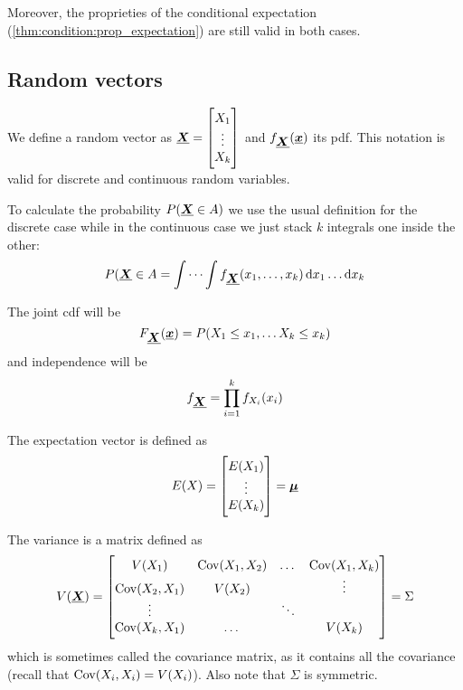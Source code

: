 \documentclass[14pt]{extarticle}
\newcommand{\cov}{{\operatorfont Cov}}
\renewcommand{\vec}[1]{\uvec{#1}}
\begin{document}
Moreover, the proprieties of the conditional expectation (\autoref{thm:condition:prop_expectation}) are still valid in both cases.

\subsection{Random vectors}

We define a random vector as $\vec X =
    \begin{bmatrix}
        X_1    \\
        \vdots \\
        X_k
    \end{bmatrix}$
and $f_{\vec X}(\vec x)$ its pdf.
This notation is valid for discrete and continuous random variables.

To calculate the probability $P(\vec X \in A)$ we use the usual definition for the discrete case while in the continuous case we just stack $k$ integrals one inside the other:
\begin{equation}
    P(\vec X \in A = \idotsint f_{\vec X}(x_1, \ldots, x_k) \dd{x_1} \ldots \dd{x_k}
\end{equation}

The joint cdf will be
\begin{equation}
    F_{\vec X}(\vec x) = P(X_1 \leq x_1, \ldots X_k \leq x_k)
\end{equation}
and independence will be
\begin{equation}
    f_{\vec X} = \prod_{i = 1}^{k} f_{X_i}(x_i)
\end{equation}

The expectation vector is defined as
\begin{equation}
    E(X) = \begin{bmatrix}
        E(X_1) \\
        \vdots \\
        E(X_k)
    \end{bmatrix} = \vec \mu
\end{equation}

The variance is a matrix defined as
\begin{equation}
    V(\vec X) = \begin{bmatrix}
        V(X_1)         & \cov(X_1, X_2) & \dots  & \cov(X_1, X_k) \\
        \cov(X_2, X_1) & V(X_2)         &        & \vdots         \\
        \vdots         &                & \ddots &                \\
        \cov(X_k, X_1) & \dots          &        & V(X_k)
    \end{bmatrix} = \Sigma
\end{equation}
which is sometimes called the covariance matrix, as it contains all the covariance (recall that $\cov(X_i, X_i)= V(X_i)$).
Also note that $\Sigma$ is symmetric.
\end{document}
